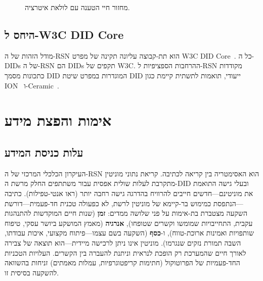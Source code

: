 \documentclass[11pt,a4paper,twocolumn]{article}
\begin{document}
\begin{figure}[ht]
\centering
{}
\caption{מחזור חיי הטענה עם לולאת איטרציה.}
\label{fig:lifecycle}
\end{figure}

\subsection{היחס ל-W3C DID Core}

מודל הזהות של ה-RSN הוא תת-קבוצה עליונה תקינה של מפרט W3C DID Core~\cite{did2022}. כל ה-DIDs של ה-RSN הם DIDs תקפים של W3C. ההרחבות הספציפיות ל-RSN מקודדות כתכונות מסמך DID המוגדרות במפרט שיטת DID ייעודי, תואמות לתשתית קיימת כגון ION~\cite{buchner2021} ו-Ceramic~\cite{ceramic2023}.

\section{אימות והפצת מידע}

\subsection{עלות כניסת המידע}

העיקרון הכלכלי המרכזי של ה-RSN הוא האסימטריה בין קריאה לכתיבה. קריאת נתוני מוניטין מתקרבת לעלות שולית אפסית עבור משתתפים החלק מרשת ה-DID ובעלי גישה התואמת את מוניטינם---חדשים חייבים להרוויח בהדרגה גישה רחבה יותר (ראו אנטי-טפילות). כתיבה---הנתפסת כמימוש בר-קיימא של מוניטין לרשת, לא כפעולה טכנית חד-פעמית---דורשת השקעה מצטברת בת-אימות על פני שלושה ממדים: \textbf{זמן} (שנות חיים המוקדשות להתנהגות עקבית, התחייבויות שמומשו וקשרים שטופחו), \textbf{אנרגיה} (מאמץ המושקע ביושר עסקי, טיפוח שותפויות ואמינות ארוכת-טווח), ו-\textbf{כסף} (השקעה בשם עצמו---פיתוח מקצועי, איכות עבודתו, השבה תמורת נזקים שנגרמו). מוניטין אינו ניתן לרכישה מיידית---הוא תוצאה של צבירה לאורך חיים שהמערכת רק הופכת לנראית וניתנת להעברה בין הקשרים. העלויות הטכניות החד-פעמיות של הפרוטוקול (חתימות קריפטוגרפיות, עמלות מאמתים) זניחות בהשוואה להשקעה בסיסית זו.
\end{document}
